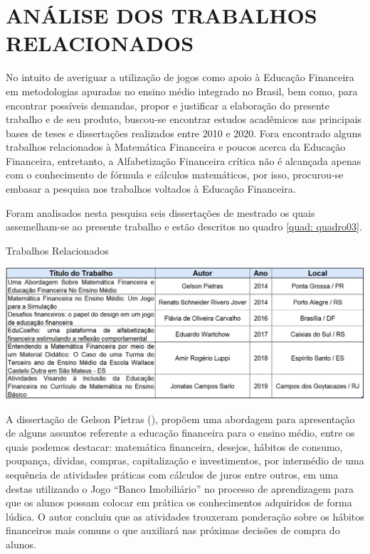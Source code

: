 \chapter{ANÁLISE DOS TRABALHOS RELACIONADOS}
No intuito de averiguar a utilização de jogos como apoio à Educação Financeira em metodologias apuradas no ensino médio integrado no Brasil, bem como, para encontrar possíveis demandas, propor e justificar a elaboração do presente trabalho e de seu produto, buscou-se encontrar estudos acadêmicos nas principais bases de teses e dissertações realizados entre 2010 e 2020. Fora encontrado alguns trabalhos relacionados à Matemática Financeira e poucos acerca da Educação Financeira, entretanto, a Alfabetização Financeira crítica não é alcançada apenas com o conhecimento de fórmula e cálculos matemáticos, por isso, procurou-se embasar a pesquisa nos trabalhos voltados à Educação Financeira.

Foram analisados nesta pesquisa seis dissertações de mestrado os quais assemelham-se ao presente trabalho e estão descritos no quadro \ref{quad: quadro03}.

\graphicspath{{quadros/}} 
\begin{quadro}[!ht]
\centering
\begin{minipage}{1.\textwidth}
\caption{Trabalhos Relacionados}
\centering
\includegraphics[width=1.0\textwidth]{quadro-3_trabalhos}
\label{quad: quadro03}
\end{minipage}
\end{quadro}

A dissertação de Gelson Pietras (\citeyear{pietras2014}), propõem uma abordagem para apresentação de alguns assuntos referente a educação financeira para o ensino médio, entre os quais podemos destacar: matemática financeira, desejos, hábitos de consumo, poupança, dívidas, compras, capitalização e investimentos, por intermédio de uma sequência de atividades práticas com cálculos de juros entre outros, em uma destas utilizando o Jogo “Banco Imobiliário” no processo de aprendizagem para que os alunos possam colocar em prática os conhecimentos adquiridos de forma lúdica. O autor concluiu que as atividades trouxeram ponderação sobre os hábitos financeiros mais comuns o que auxiliará nas próximas decisões de compra do alunos.

